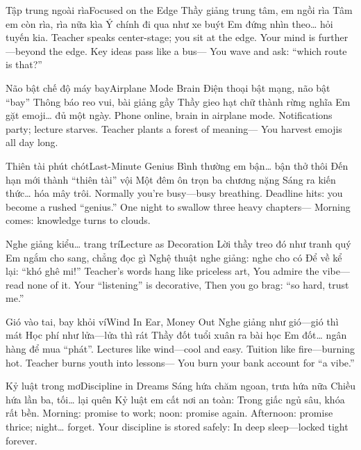\begin{tutuyetbox}{Tập trung ngoài rìa}{Focused on the Edge}
Thầy giảng trung tâm, em ngồi rìa
Tâm em còn rìa, rìa nữa kìa
Ý chính đi qua như xe buýt
Em đứng nhìn theo… hỏi tuyến kia.
\tcblower
Teacher speaks center-stage; you sit at the edge.
Your mind is further—beyond the edge.
Key ideas pass like a bus—
You wave and ask: “which route is that?”
\end{tutuyetbox}

\begin{tutuyetbox}{Não bật chế độ máy bay}{Airplane Mode Brain}
Điện thoại bật mạng, não bật “bay”
Thông báo reo vui, bài giảng gầy
Thầy gieo hạt chữ thành rừng nghĩa
Em gặt emoji… đủ một ngày.
\tcblower
Phone online, brain in airplane mode.
Notifications party; lecture starves.
Teacher plants a forest of meaning—
You harvest emojis all day long.
\end{tutuyetbox}

\begin{tutuyetbox}{Thiên tài phút chót}{Last-Minute Genius}
Bình thường em bận… bận thở thôi
Đến hạn mới thành “thiên tài” vội
Một đêm ôn trọn ba chương nặng
Sáng ra kiến thức… hóa mây trôi.
\tcblower
Normally you’re busy—busy breathing.
Deadline hits: you become a rushed “genius.”
One night to swallow three heavy chapters—
Morning comes: knowledge turns to clouds.
\end{tutuyetbox}

\begin{tutuyetbox}{Nghe giảng kiểu… trang trí}{Lecture as Decoration}
Lời thầy treo đó như tranh quý
Em ngắm cho sang, chẳng đọc gì
Nghệ thuật nghe giảng: nghe cho có
Để về kể lại: “khó ghê mi!”
\tcblower
Teacher’s words hang like priceless art,
You admire the vibe—read none of it.
Your “listening” is decorative,
Then you go brag: “so hard, trust me.”
\end{tutuyetbox}

\begin{tutuyetbox}{Gió vào tai, bay khỏi ví}{Wind In Ear, Money Out}
Nghe giảng như gió—gió thì mát
Học phí như lửa—lửa thì rát
Thầy đốt tuổi xuân ra bài học
Em đốt… ngân hàng để mua “phát”.
\tcblower
Lectures like wind—cool and easy.
Tuition like fire—burning hot.
Teacher burns youth into lessons—
You burn your bank account for “a vibe.”
\end{tutuyetbox}

\begin{tutuyetbox}{Kỷ luật trong mơ}{Discipline in Dreams}
Sáng hứa chăm ngoan, trưa hứa nữa
Chiều hứa lần ba, tối… lại quên
Kỷ luật em cất nơi an toàn:
Trong giấc ngủ sâu, khóa rất bền.
\tcblower
Morning: promise to work; noon: promise again.
Afternoon: promise thrice; night… forget.
Your discipline is stored safely:
In deep sleep—locked tight forever.
\end{tutuyetbox}